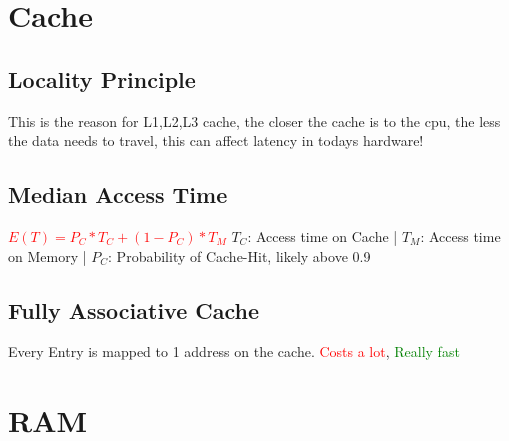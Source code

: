 \documentclass[main.tex,fontsize=8pt,paper=a4,paper=landscape,DIV=calc,]{scrartcl}
\begin{document}
\begin{multicols*}{4}
\section{Cache}

\subsection{Locality Principle}
This is the reason for L1,L2,L3 cache, the closer the cache is to the cpu, the less the data needs to travel, this can affect latency in todays hardware!

\subsection{Median Access Time}
\textcolor{red}{\(E(T) = P_C * T_C + (1 - P_C )* T_M\)}\newline
\(T_C\): Access time on Cache |
\(T_M\): Access time on Memory |
\(P_C\): Probability of Cache-Hit, likely above 0.9

\subsection{Fully Associative Cache}
Every Entry is mapped to 1 address on the cache. 
\textcolor{red}{Costs a lot}, \textcolor{green}{Really fast}

\subsection{}

\section{RAM}

\end{multicols*}
\end{document}
